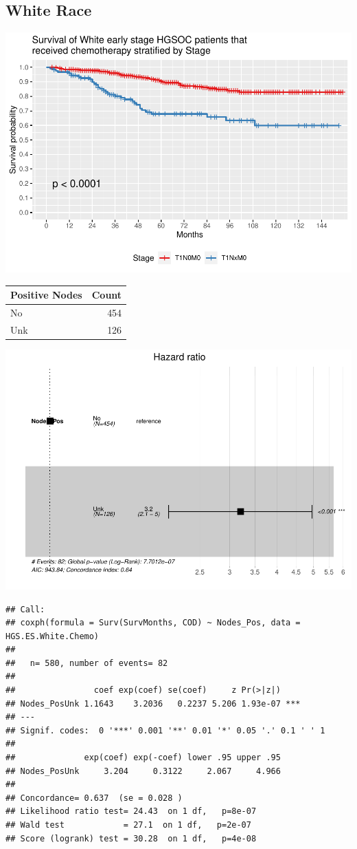 \documentclass[
]{article}
\begin{document}
\hypertarget{white-race}{%
\subsection{White Race}\label{white-race}}

\includegraphics{EarlyOvaryRace_files/figure-latex/unnamed-chunk-10-1.pdf}

\begin{tabular}[t]{l|r}
\hline
Positive Nodes & Count\\
\hline
No & 454\\
\hline
Unk & 126\\
\hline
\end{tabular}

\includegraphics{EarlyOvaryRace_files/figure-latex/unnamed-chunk-11-1.pdf}

\begin{verbatim}
## Call:
## coxph(formula = Surv(SurvMonths, COD) ~ Nodes_Pos, data = HGS.ES.White.Chemo)
## 
##   n= 580, number of events= 82 
## 
##                coef exp(coef) se(coef)     z Pr(>|z|)    
## Nodes_PosUnk 1.1643    3.2036   0.2237 5.206 1.93e-07 ***
## ---
## Signif. codes:  0 '***' 0.001 '**' 0.01 '*' 0.05 '.' 0.1 ' ' 1
## 
##              exp(coef) exp(-coef) lower .95 upper .95
## Nodes_PosUnk     3.204     0.3122     2.067     4.966
## 
## Concordance= 0.637  (se = 0.028 )
## Likelihood ratio test= 24.43  on 1 df,   p=8e-07
## Wald test            = 27.1  on 1 df,   p=2e-07
## Score (logrank) test = 30.28  on 1 df,   p=4e-08
\end{verbatim}
\end{document}
